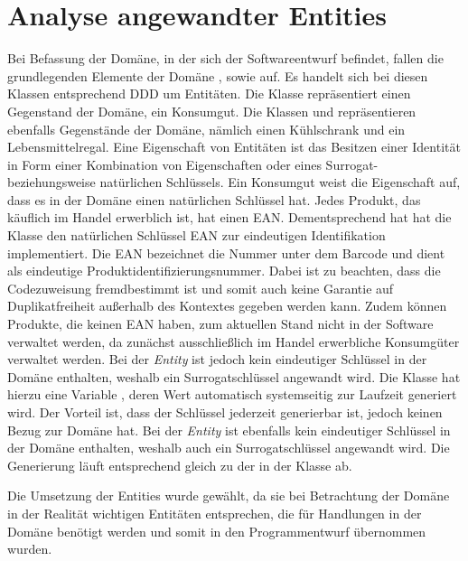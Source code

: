 \section{Analyse angewandter Entities}
\label{domaindrivendesign>entities}
Bei Befassung der Domäne, in der sich der Softwareentwurf befindet, fallen die grundlegenden Elemente der Domäne \href{}{}, \href{}{} sowie \href{}{} auf.
Es handelt sich bei diesen Klassen entsprechend \ac{DDD} um Entitäten.
Die Klasse \href{}{\code{}} repräsentiert einen Gegenstand der Domäne, ein Konsumgut.
Die Klassen \href{}{\code{}} und \href{}{\code{}} repräsentieren ebenfalls Gegenstände der Domäne, nämlich einen Kühlschrank und ein Lebensmittelregal.
Eine Eigenschaft von Entitäten ist das Besitzen einer Identität in Form einer Kombination von Eigenschaften oder eines Surrogat- beziehungsweise natürlichen Schlüssels.
Ein Konsumgut weist die Eigenschaft auf, dass es in der Domäne einen natürlichen Schlüssel hat.
Jedes Produkt, das käuflich im Handel erwerblich ist, hat einen \ac{EAN}.
Dementsprechend hat hat die Klasse \href{}{\code{}} den natürlichen Schlüssel \href{}{\code{}}\ac{EAN} zur eindeutigen Identifikation implementiert.
Die \ac{EAN} bezeichnet die Nummer unter dem Barcode und dient als eindeutige Produktidentifizierungsnummer.
Dabei ist zu beachten, dass die Codezuweisung fremdbestimmt ist und somit auch keine Garantie auf Duplikatfreiheit außerhalb des Kontextes gegeben werden kann.
Zudem können Produkte, die keinen \ac{EAN} haben, zum aktuellen Stand nicht in der Software verwaltet werden, da zunächst ausschließlich im Handel erwerbliche Konsumgüter verwaltet werden.
Bei der \textit{Entity} \href{}{\code{}} ist jedoch kein eindeutiger Schlüssel in der Domäne enthalten, weshalb ein Surrogatschlüssel angewandt wird.
Die Klasse \href{}{\code{}} hat hierzu eine Variable \href{}{}, deren Wert automatisch systemseitig zur Laufzeit generiert wird.
Der Vorteil ist, dass der Schlüssel jederzeit generierbar ist, jedoch keinen Bezug zur Domäne hat.
Bei der \textit{Entity} \href{}{\code{}} ist ebenfalls kein eindeutiger Schlüssel in der Domäne enthalten, weshalb auch ein Surrogatschlüssel angewandt wird.
Die Generierung läuft entsprechend gleich zu der in der Klasse \href{}{\code{}} ab.

Die Umsetzung der Entities wurde gewählt, da sie bei Betrachtung der Domäne in der Realität wichtigen Entitäten entsprechen, die für Handlungen in der Domäne benötigt werden und somit in den Programmentwurf übernommen wurden.

